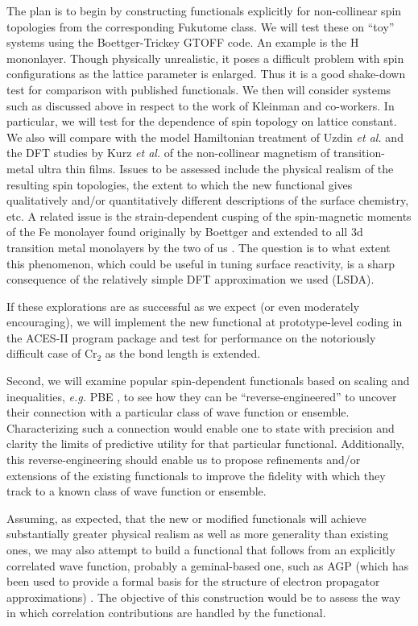 \documentclass[nofootinbib,floatfix,aps,pra,preprint]{revtex4}
\begin{document}
\textrm{The plan is to begin by constructing functionals explicitly for
non-collinear spin topologies from the corresponding Fukutome class. We will
test these on ``toy'' systems using the Boettger-Trickey GTOFF code. An
example is the H mononlayer. Though physically unrealistic, it poses a
difficult problem with spin configurations as the lattice parameter is
enlarged. Thus it is a good shake-down test for comparison with published
functionals. We then will consider systems such as discussed above in
respect to the work of Kleinman and co-workers. In particular, we will test
for the dependence of spin topology on lattice constant. We also will
compare with the model Hamiltonian treatment of Uzdin \emph{et al.} \cite%
{Uzdin99} and the DFT studies by Kurz \emph{et al.} \cite{Kurz00} of the
non-collinear magnetism of transition-metal ultra thin films. Issues to be
assessed include the physical realism of the resulting spin topologies, the
extent to which the new functional gives qualitatively and/or quantitatively
different descriptions of the surface chemistry, etc. A related issue is the
strain-dependent cusping of the spin-magnetic moments of the Fe monolayer
found originally by Boettger and extended to all 3d transition metal
monolayers by the two of us \cite{JCB93}. The question is to what extent
this phenomenon, which could be useful in tuning surface reactivity, is a
sharp consequence of the relatively simple DFT approximation we used (LSDA). 
}

\textrm{If these explorations are as successful as we expect (or even
moderately encouraging), we will implement the new functional at
prototype-level coding in the ACES-II program package \cite{ACESII} and test
for performance on the notoriously difficult case of Cr$_2$ as the bond
length is extended. }

\textrm{Second, we will examine popular spin-dependent functionals based on
scaling and inequalities, \emph{e.g.} PBE \cite{PBE}, to see how they can be
``reverse-engineered'' to uncover their connection with a particular class
of wave function or ensemble. Characterizing such a connection would enable
one to state with precision and clarity the limits of predictive utility for
that particular functional. Additionally, this reverse-engineering should
enable us to propose refinements and/or extensions of the existing
functionals to improve the fidelity with which they track to a known class
of wave function or ensemble. }

\textrm{Assuming, as expected, that the new or modified functionals will
achieve substantially greater physical realism as well as more generality
than existing ones, we may also attempt to build a functional that follows
from an explicitly correlated wave function, probably a geminal-based one,
such as AGP (which has been used to provide a formal basis for the structure
of electron propagator approximations) \cite{AGP}. The objective of this
construction would be to assess the way in which correlation contributions
are handled by the functional. }
\end{document}
